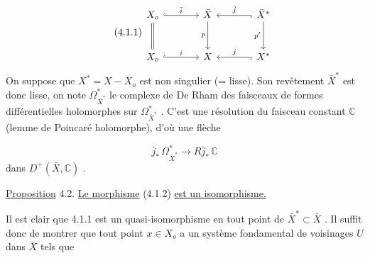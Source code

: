 \begin{equation}\tag{4.1.1}
\begin{tikzcd}[column sep=large, row sep=large]
X_o \arrow[r, hook, "\bar{i}"] \arrow[d, equal] & \bar{X} \arrow[d, "p"'] & \bar{X}^* \arrow[l, hook, "\bar{j}"'] \arrow[d, "p'"'] \\
X_o \arrow[r, hook, "i"] & X & X^* \arrow[l, hook, "j"']
\end{tikzcd}
\end{equation}
On suppose que $X^* = X - X_o$ est non singulier (= lisse). Son revêtement $\bar{X}^*$ est donc lisse, on note $\Omega^*_{\bar{X}^*}$ le complexe de De Rham des faisceaux de formes différentielles holomorphes sur $\Omega^*_{\bar{X}^*}$ . C'est une résolution du faisceau constant $\mathbb{C}$ (lemme de Poincaré holomorphe), d'où une flèche

\begin{equation}\tag{4.1.2}
\bar{j}_* \, \Omega^*_{\bar{X}^*} \longrightarrow R\bar{j}_* \, \mathbb{C}
\end{equation}
dans $D^+(\bar{X}, \mathbb{C})$ .

\underline{Proposition} 4.2.  \underline{Le morphisme} (4.1.2) \underline{est un isomorphisme.}

Il est clair que 4.1.1 est un quasi-isomorphisme en tout point de $\bar{X}^* \subset \bar{X}$ . Il suffit donc de montrer que tout point $x \in X_o$ a un système fondamental de voisinages $U$ dans $\bar{X}$ tels que

